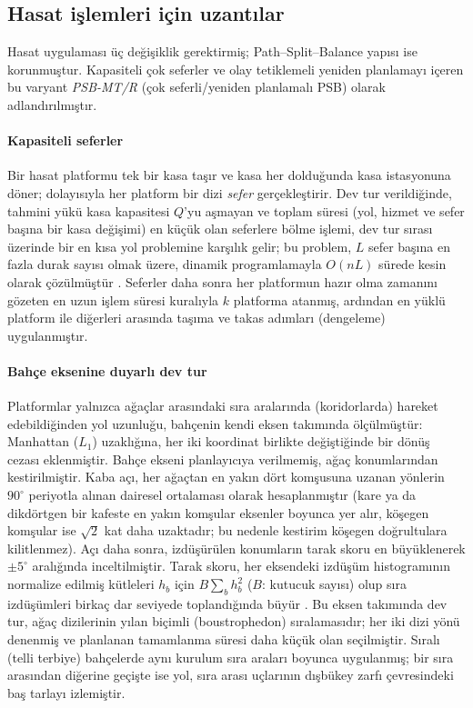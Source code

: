 \subsection{Hasat işlemleri için uzantılar}\label{sec:ext}
Hasat uygulaması üç değişiklik gerektirmiş;
Path--Split--Balance yapısı ise korunmuştur. Kapasiteli çok seferler ve olay
tetiklemeli yeniden planlamayı içeren bu varyant \emph{PSB-MT/R}
(çok seferli/yeniden planlamalı PSB) olarak adlandırılmıştır.

\paragraph{Kapasiteli seferler} Bir hasat platformu tek bir kasa taşır ve kasa her dolduğunda
kasa istasyonuna döner; dolayısıyla her platform bir dizi
\emph{sefer} gerçekleştirir. Dev tur verildiğinde, tahmini yükü kasa kapasitesi $Q$'yu
aşmayan ve toplam süresi (yol, hizmet ve sefer başına bir kasa değişimi) en küçük olan
seferlere bölme işlemi, dev tur sırası üzerinde bir en kısa yol problemine karşılık gelir; bu problem, $L$ sefer başına
en fazla durak sayısı olmak üzere, dinamik programlamayla $O(nL)$ sürede kesin olarak
çözülmüştür \citep{beasley1983,prins2004}. Seferler daha sonra
her platformun hazır olma zamanını gözeten en uzun işlem süresi kuralıyla $k$ platforma atanmış,
ardından en yüklü platform ile diğerleri arasında taşıma ve takas adımları
(dengeleme) uygulanmıştır.

\paragraph{Bahçe eksenine duyarlı dev tur} Platformlar yalnızca ağaçlar arasındaki sıra aralarında
(koridorlarda) hareket edebildiğinden yol uzunluğu, bahçenin kendi eksen takımında ölçülmüştür: Manhattan
($L_1$) uzaklığına, her iki koordinat birlikte değiştiğinde bir dönüş cezası eklenmiştir. Bahçe
ekseni planlayıcıya verilmemiş, ağaç konumlarından kestirilmiştir.
Kaba açı, her ağaçtan en yakın dört komşusuna uzanan yönlerin $90^\circ$ periyotla
alınan dairesel ortalaması olarak hesaplanmıştır (kare ya da
dikdörtgen bir kafeste en yakın komşular eksenler boyunca yer alır, köşegen komşular ise
$\sqrt2$ kat daha uzaktadır; bu nedenle kestirim köşegen doğrultulara kilitlenmez). Açı
daha sonra, izdüşürülen konumların tarak skoru en büyüklenerek $\pm5^\circ$ aralığında inceltilmiştir.
Tarak skoru, her eksendeki izdüşüm histogramının normalize edilmiş kütleleri
$h_b$ için $B\sum_b h_b^2$ ($B$: kutucuk sayısı) olup sıra izdüşümleri birkaç
dar seviyede toplandığında büyür \citep{asil2026frame}. Bu eksen takımında dev tur, ağaç dizilerinin yılan biçimli
(boustrophedon) sıralamasıdır; her iki dizi yönü denenmiş ve
planlanan tamamlanma süresi daha küçük olan seçilmiştir. Sıralı (telli terbiye) bahçelerde aynı
kurulum sıra araları boyunca uygulanmış; bir sıra arasından diğerine geçişte ise yol, sıra arası uçlarının
dışbükey zarfı çevresindeki baş tarlayı izlemiştir.

